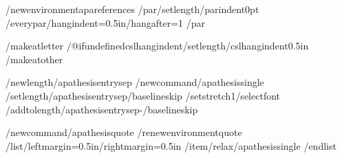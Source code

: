 /newenvironment{apareferences}
  {/par/setlength{/parindent}{0pt}%
   /everypar{/hangindent=0.5in/hangafter=1}}
  {/par}

/makeatletter
/@ifundefined{cslhangindent}{}{/setlength{/cslhangindent}{0.5in}}
/makeatother


%
/newlength{/apathesisentrysep}
/newcommand{/apathesissingle}{%
  /setlength{/apathesisentrysep}{/baselineskip}%
  /setstretch{1}/selectfont
  /addtolength{/apathesisentrysep}{-/baselineskip}}

/newcommand{/apathesisquote}{%
  /renewenvironment{quote}
    {/list{}{/leftmargin=0.5in/rightmargin=0.5in}%
     /item/relax/apathesissingle}
    {/endlist}}

